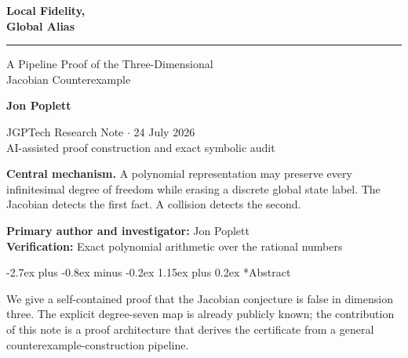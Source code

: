 \documentclass[11pt,letterpaper]{article}
\makeatletter
\theoremstyle{jgpplain}
\renewcommand{\section}{\@startsection{section}{1}{0pt}%
  {-2.7ex plus -0.8ex minus -0.2ex}%
  {1.15ex plus 0.2ex}%
  {\normalfont\sffamily\Large\bfseries\color{JGPBlue}}}
\makeatother
\begin{document}
\hypersetup{pageanchor=false}
\begin{titlepage}
\thispagestyle{empty}
\vspace*{0.38in}

{\sffamily\bfseries\fontsize{29}{33}\selectfont\color{JGPInk}
Local Fidelity,\\[2pt]Global Alias\par}

\vspace{0.22in}
{\color{JGPBlue}\rule{\textwidth}{2.2pt}}
\vspace{0.22in}

{\sffamily\fontsize{16}{21}\selectfont\color{JGPDarkBlue}
A Pipeline Proof of the Three-Dimensional\\
Jacobian Counterexample\par}

\vspace{0.42in}

{\sffamily\bfseries\large Jon Poplett\par}
\vspace{0.08in}
{\sffamily\color{JGPMuted}
JGPTech Research Note \(\cdot\) 24 July 2026\\
AI-assisted proof construction and exact symbolic audit\par}

\vspace{0.52in}

\begin{mechanismbox}
\textbf{\color{JGPDarkBlue}Central mechanism.}
A polynomial representation may preserve every infinitesimal degree of freedom
while erasing a discrete global state label. The Jacobian detects the first
fact. A collision detects the second.
\end{mechanismbox}

\vfill

{\sffamily\small\color{JGPMuted}
\textbf{Primary author and investigator:} Jon Poplett\\
\textbf{Verification:} Exact polynomial arithmetic over the rational numbers
\par}
\end{titlepage}
\hypersetup{pageanchor=true}
\setcounter{page}{1}

\section*{Abstract}

We give a self-contained proof that the Jacobian conjecture is false in
dimension three. The explicit degree-seven map is already publicly known; the
contribution of this note is a proof architecture that derives the certificate
from a general counterexample-construction pipeline.
\end{document}
